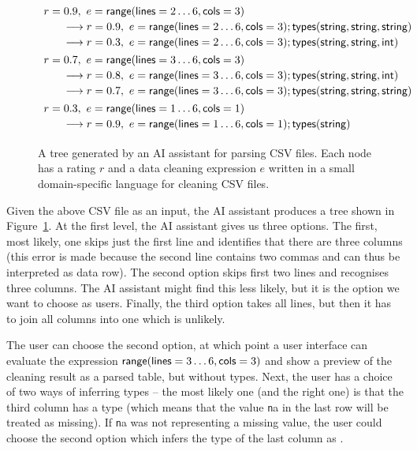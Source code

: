 \documentclass{article}
\begin{document}
\begin{figure}
\begin{equation*}
\begin{array}{l}
r=0.9,~ e=\textnormal{\sffamily range}(\textnormal{\sffamily lines}=2\ldots 6, \textnormal{\sffamily cols}=3)\\[0.2em]
\qquad\longrightarrow r=0.9,~ e=\textnormal{\sffamily range}(\textnormal{\sffamily lines}=2\ldots 6, \textnormal{\sffamily cols}=3); \textnormal{\sffamily types}(\textnormal{\sffamily string},\textnormal{\sffamily string},\textnormal{\sffamily string})\\[0.2em]
\qquad\longrightarrow r=0.3,~ e=\textnormal{\sffamily range}(\textnormal{\sffamily lines}=2\ldots 6, \textnormal{\sffamily cols}=3); \textnormal{\sffamily types}(\textnormal{\sffamily string},\textnormal{\sffamily string},\textnormal{\sffamily int})\\[0.4em]
r=0.7,~ e=\textnormal{\sffamily range}(\textnormal{\sffamily lines}=3\ldots 6, \textnormal{\sffamily cols}=3)\\[0.2em]
\qquad\longrightarrow r=0.8,~ e=\textnormal{\sffamily range}(\textnormal{\sffamily lines}=3\ldots 6, \textnormal{\sffamily cols}=3); \textnormal{\sffamily types}(\textnormal{\sffamily string},\textnormal{\sffamily string},\textnormal{\sffamily int})\\[0.2em]
\qquad\longrightarrow r=0.7,~ e=\textnormal{\sffamily range}(\textnormal{\sffamily lines}=3\ldots 6, \textnormal{\sffamily cols}=3); \textnormal{\sffamily types}(\textnormal{\sffamily string},\textnormal{\sffamily string},\textnormal{\sffamily string})\\[0.4em]
r=0.3,~ e=\textnormal{\sffamily range}(\textnormal{\sffamily lines}=1\ldots 6, \textnormal{\sffamily cols}=1)\\[0.2em]
\qquad\longrightarrow r=0.9,~ e=\textnormal{\sffamily range}(\textnormal{\sffamily lines}=1\ldots 6, \textnormal{\sffamily cols}=1); \textnormal{\sffamily types}(\textnormal{\sffamily string})\\[0.2em]
\end{array}
\end{equation*}
\caption{A tree generated by an AI assistant for parsing CSV files. Each node has a rating $r$ and
a data cleaning expression $e$ written in a small domain-specific language for cleaning CSV files.}
\label{fig:csvtree}
\end{figure}

Given the above CSV file as an input, the AI assistant produces a tree shown in Figure~\ref{fig:csvtree}.
At the first level, the AI assistant gives us three options. The first, most likely, one skips just 
the first line and identifies that there are three columns (this error is made because the second line contains 
two commas and can thus be interpreted as data row). The second option skips first two lines and recognises
three columns. The AI assistant might find this less likely, but it is the option we want to choose
as users. Finally, the third option takes all lines, but then it has to join all columns into one
which is unlikely.

The user can choose the second option, at which point a user interface can evaluate the 
expression $\textnormal{\sffamily range}(\textnormal{\sffamily lines}=3\ldots 6, \textnormal{\sffamily cols}=3)$ and show a preview of 
the cleaning result as a parsed table, but without types. Next, the user has a choice of two ways of inferring types -- the most 
likely one (and the right one) is that the third column has a type  (which means that
the value {\texttt na} in the last row will be treated as missing). If {\texttt na} was not 
representing a missing value, the user could choose the second option which infers the type of the 
last column as .
\end{document}
